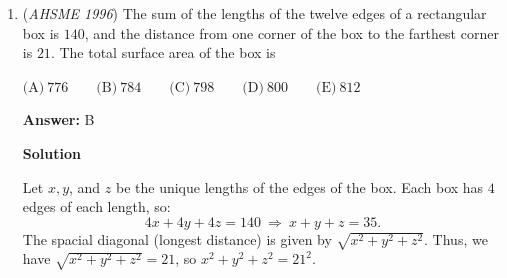 \begin{enumerate}
 $\text{(A)}\ \frac{1}{4}\qquad\text{(B)}\ \frac{1}{3}\qquad\text{(C)}\ \frac{1}{2}\qquad\text{(D)}\ \frac{2}{3}\qquad\text{(E)}\ \frac{3}{4}$

 \textbf{Answer: }B



\textbf{Solution}

Let $WXYZ$ be a convex \href{https://artofproblemsolving.com/wiki/index.php?title=Cyclic\_quadrilateral}{cyclic quadrilateral} inscribed in a circle.  There are $\frac{\binom{4}{2}}{2} = 3$ ways to divide the points into two groups of two.

 If you pick $WX$ and $YZ$, you have two sides of the quadrilateral, which do not intersect.

 If you pick $XY$ and $ZW$, you have the other two sides of the quadrilateral, which do not intersect.

 If you pick $WY$ and $XZ$, you have the diagonals of the quadrilateral, which do intersect.

 Any four points on the original circle of $1996$ can be connected to form such a convex quadrilateral $WXYZ$, and only placing $A$ and $C$ as one of the diagonals of the figure will form intersecting chords.  Thus, the answer is $\frac{1}{3}$, which is option $\boxed{\text{B}}$.

 Notice that $1996$ is irrelevant to the solution of the problem; in fact, you may pick points from the entire \href{https://artofproblemsolving.com/wiki/index.php?title=Circumference}{circumference} of the circle.

 


	\item (\textit{AHSME 1996}) The sum of the lengths of the twelve edges of a rectangular box is $140$, and 
the distance from one corner of the box to the farthest corner is $21$. The total 
surface area of the box is 


 $\text{(A)}\ 776\qquad\text{(B)}\ 784\qquad\text{(C)}\ 798\qquad\text{(D)}\ 800\qquad\text{(E)}\ 812$

 \textbf{Answer: }B



\textbf{Solution}

Let $x, y$, and $z$ be the unique lengths of the edges of the box.  Each box has $4$ edges of each length, so:
 \[4x + 4y + 4z = 140 \ \Longrightarrow \ x + y + z = 35.\]The spacial diagonal (longest distance) is given by $\sqrt{x^2 + y^2 + z^2}$.  Thus, we have $\sqrt{x^2 + y^2 + z^2} = 21$, so $x^2 + y^2 + z^2 = 21^2$.


\end{enumerate}
